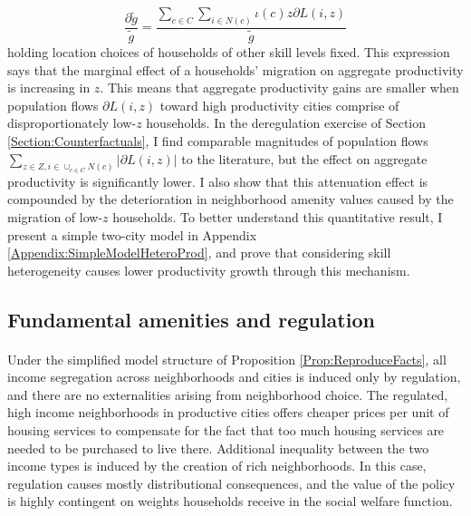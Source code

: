 \documentclass[12pt]{article}
\begin{document}
\begin{equation}
	\frac{\partial \tilde{g}}{\tilde{g}} = \frac{\sum_{c \in C}\sum_{i \in N(c)} \iota(c)z\partial L(i,z)}{\tilde{g}}
\end{equation}
holding location choices of households of other skill levels fixed. This expression says that the marginal effect of a households' migration on aggregate productivity is increasing in $z$. This means that aggregate productivity gains are smaller when population flows $\partial L(i, z)$ toward high productivity cities comprise of disproportionately low-$z$ households. In the deregulation exercise of Section \ref{Section:Counterfactuals}, I find comparable magnitudes of population flows $\sum_{z \in Z, i \in \cup_{c \in C}N(c)}|\partial L(i, z)|$ to the literature, but the effect on aggregate productivity is significantly lower. I also show that this attenuation effect is compounded by the deterioration in neighborhood amenity values caused by the migration of low-$z$ households. To better understand this quantitative result, I present a simple two-city model in Appendix \ref{Appendix:SimpleModelHeteroProd}, and prove that considering skill heterogeneity causes lower productivity growth through this mechanism.


\subsection{Fundamental amenities and regulation}\label{Theory:Externality}

\paragraph*{}
Under the simplified model structure of Proposition \ref{Prop:ReproduceFacts}, all income segregation across neighborhoods and cities is induced only by regulation, and there are no externalities arising from neighborhood choice. The regulated, high income neighborhoods in productive cities offers cheaper prices per unit of housing services to compensate for the fact that too much housing services are needed to be purchased to live there. Additional inequality between the two income types is induced by the creation of rich neighborhoods. In this case, regulation causes mostly distributional consequences, and the value of the policy is highly contingent on weights households receive in the social welfare function.
\end{document}
